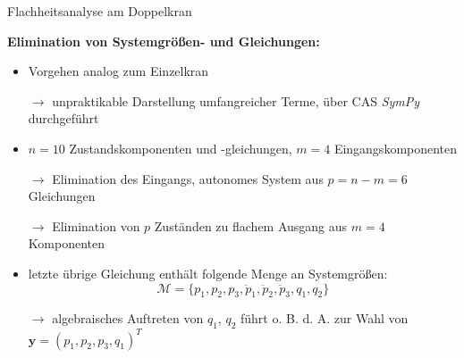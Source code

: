 \documentclass[
	ngerman,
	10pt,				%
	aspectratio=169 	%
]{beamer}
\begin{document}

\begin{frame}[t,fragile,label=Flachheit_Doppelkran_1]{\large Flachheitsanalyse am Doppelkran}
	
	\textbf{Elimination von Systemgrößen- und Gleichungen:}
	
	\begin{itemize}
		\item Vorgehen analog zum Einzelkran
		\pause
		\item[$\rightarrow$] unpraktikable Darstellung umfangreicher Terme, über CAS \textit{SymPy} durchgeführt
		\pause
		\bigskip
		\item $n = 10$ Zustandskomponenten und -gleichungen, $m = 4$ Eingangskomponenten
		\pause
		\item[$\rightarrow$] Elimination des Eingangs, autonomes System aus $p = n - m = 6$ Gleichungen
		\pause
		\item[$\rightarrow$] Elimination von $p$ Zuständen zu flachem Ausgang aus $m = 4$ Komponenten
		\pause
		\bigskip
		\item letzte übrige Gleichung enthält folgende Menge an Systemgrößen:
		\begin{equation*}
			\mathcal{M} = \{p_1, p_2, p_3, \ddot{p}_1, \ddot{p}_2, \ddot{p}_3, q_1, q_2 \}
		\end{equation*}
		\pause
		\item[$\rightarrow$] algebraisches Auftreten von $q_1$, $q_2$ führt o. B. d. A. zur Wahl von $\mathbf{y} = (p_1, p_2, p_3, q_1)^T$
	\end{itemize}
	
\end{frame}

\end{document}

